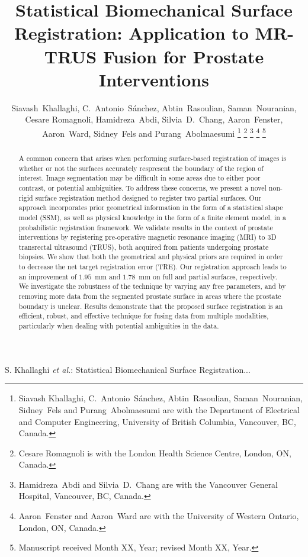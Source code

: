 \documentclass[journal]{IEEEtran}
\begin{document}
\title{Statistical Biomechanical Surface Registration: Application to MR-TRUS Fusion for Prostate Interventions}

\author{Siavash~Khallaghi, C.~Antonio~S\'anchez, Abtin~Rasoulian, Saman~Nouranian, Cesare Romagnoli, Hamidreza~Abdi, Silvia~D.~Chang, Aaron~Fenster, Aaron~Ward, Sidney~Fels and Purang~Abolmaesumi%
\thanks{Siavash Khallaghi, C.~Antonio~S\'anchez, Abtin~Rasoulian, Saman~Nouranian, Sidney~Fels and Purang~Abolmaesumi are with the Department of Electrical and Computer Engineering, University of British Columbia, Vancouver, BC, Canada.}%
\thanks{Cesare Romagnoli is with the London Health Science Centre, London, ON, Canada.}%
\thanks{Hamidreza~Abdi and Silvia~D.~Chang are with the Vancouver General Hospital, Vancouver, BC, Canada.}%
\thanks{Aaron~Fenster and Aaron~Ward are with the University of Western Ontario, London, ON, Canada.}%
\thanks{Manuscript received Month XX, Year; revised Month XX, Year.}}

%
{S. Khallaghi \MakeLowercase{\textit{et al.}}: Statistical Biomechanical Surface Registration...}

\maketitle

\begin{abstract}
A common concern that arises when performing surface-based registration of images is whether or not the surfaces accurately respresent the boundary of the region of interest.  Image segmentation may be difficult in some areas due to either poor contrast, or potential ambiguities.  To address these concerns, we present a novel non-rigid surface registration method designed to register two partial surfaces. %
Our approach incorporates prior geometrical information in the form of a statistical shape model (SSM), as well as physical knowledge in the form of a finite element model, in a probabilistic registration framework. We validate results in the context of prostate interventions by registering pre-operative magnetic resonance imaging (MRI) to 3D transrectal ultrasound (TRUS), both acquired from patients undergoing prostate biopsies. We show that both the geometrical and physical priors are required in order to decrease the net target registration error (TRE). Our registration approach leads to an improvement of $1.95$~mm and $1.78$~mm on full and partial surfaces, respectively. We investigate the robustness of the technique by varying any free parameters, and by removing more data from the segmented prostate surface in areas where the prostate boundary is unclear. Results demonstrate that the proposed surface registration is an efficient, robust, and effective technique for fusing data from multiple modalities, particularly when dealing with potential ambiguities in the data.
\end{abstract}
\end{document}
